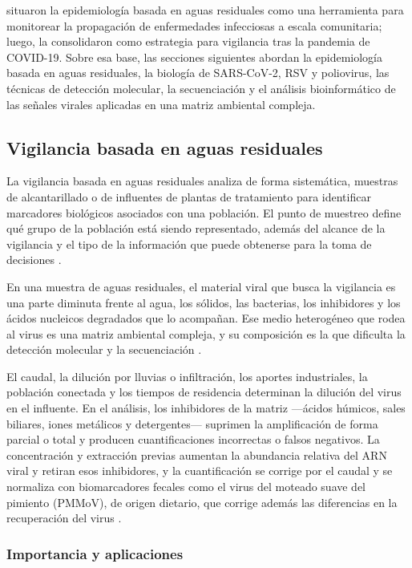  situaron la epidemiología basada en aguas residuales como una herramienta para monitorear la propagación de enfermedades infecciosas a escala comunitaria; luego,  la consolidaron como estrategia para vigilancia tras la pandemia de COVID-19. Sobre esa base, las secciones siguientes abordan la epidemiología basada en aguas residuales, la biología de SARS-CoV-2, RSV y poliovirus, las técnicas de detección molecular, la secuenciación y el análisis bioinformático de las señales virales aplicadas en una matriz ambiental compleja.

\subsection{Vigilancia basada en aguas residuales}

La vigilancia basada en aguas residuales analiza de forma sistemática, muestras de alcantarillado o de influentes de plantas de tratamiento para identificar marcadores biológicos asociados con una población. El punto de muestreo define qué grupo de la población está siendo representado, además del alcance de la vigilancia y el tipo de la información que puede obtenerse para la toma de decisiones \cite{Parkins_2023}.

En una muestra de aguas residuales, el material viral que busca la vigilancia es una parte diminuta frente al agua, los sólidos, las bacterias, los inhibidores y los ácidos nucleicos degradados que lo acompañan. Ese medio heterogéneo que rodea al virus es una matriz ambiental compleja, y su composición es la que dificulta la detección molecular y la secuenciación \cite{Child_2023,Parkins_2023}.

El caudal, la dilución por lluvias o infiltración, los aportes industriales, la población conectada y los tiempos de residencia determinan la dilución del virus en el influente. En el análisis, los inhibidores de la matriz —ácidos húmicos, sales biliares, iones metálicos y detergentes— suprimen la amplificación de forma parcial o total y producen cuantificaciones incorrectas o falsos negativos. La concentración y extracción previas aumentan la abundancia relativa del ARN viral y retiran esos inhibidores, y la cuantificación se corrige por el caudal y se normaliza con biomarcadores fecales como el virus del moteado suave del pimiento (PMMoV), de origen dietario, que corrige además las diferencias en la recuperación del virus \cite{Chan_2025,Parkins_2023}.

\subsubsection{Importancia y aplicaciones}

